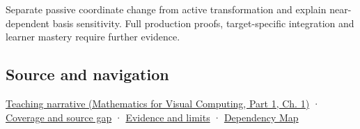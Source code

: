Separate passive coordinate change from active transformation and explain near-dependent basis sensitivity. Full production proofs, target-specific integration and learner mastery require further evidence.

\subsection{Source and navigation}\label{appendix-ce0341f7ea0d-source-and-navigation}

\hypertarget{appendix-ce0341f7ea0d-source-and-navigation}{}

\href{../02-Mathematics-for-Visual-Computing-P01/main.pdf\#nameddest=01-foundations-i-ch017-a-basis-is-a-measuring-arrangement-not-the-vector-itself}{Teaching narrative (Mathematics for Visual Computing, Part 1, Ch. 1)} · \hyperref[appendix-fd090d982a15-phase-6---parts-501-600]{Coverage and source gap} · \hyperref[appendix-a103e7846d21-phase-6---source-analysis-and-verification]{Evidence and limits} · \hyperref[appendix-4ad47bdd269a]{Dependency Map}
